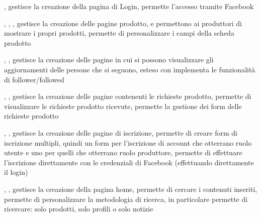 
{, }
{ gestisce la creazione della pagina di Login,  permette l'accesso tramite Facebook}


{, , , }
{ gestisce la creazione delle pagine prodotto,  e  permettono ai produttori di mostrare i propri prodotti,  permette di personalizzare i campi della scheda prodotto}


{, , }
{ gestisce la creazione delle pagine in cui si possono visualizzare gli aggiornamenti delle persone che si seguono,  esteso con  implementa le funzionalità di follower/followed}


{, , }
{ gestisce la creazione delle pagine contenenti le richieste prodotto,  permette di visualizzare le richieste prodotto ricevute,  permette la gestione dei form delle richieste prodotto}


{, , }
{ gestisce la creazione delle pagine di iscrizione,  permette di creare form di iscrizione multipli, quindi un form per l'iscrizione di account che otterrano ruolo utente e uno per quelli che otterrano ruolo produttore,  permette di effettuare l'iscrizione direttamente con le credenziali di Facebook (effettuando direttamente il login)}


{, , }
{ gestisce la creazione della pagina home,  permette di cercare i contenuti inseriti,  permette di personalizzare la metodologia di ricerca, in particolare permette di ricercare: solo prodotti, solo profili o solo notizie}


